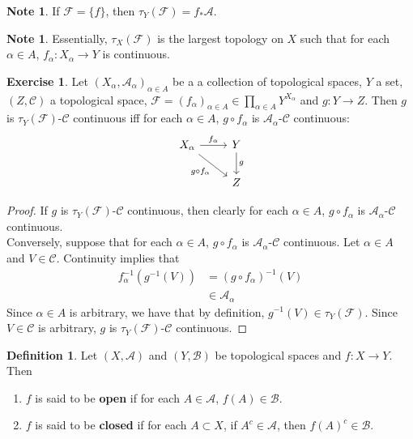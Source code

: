 \documentclass[12pt]{amsart}
\theoremstyle{definition}
\newtheorem{defn}[definition]{Definition}
\newtheorem{note}[definition]{Note}
\newtheorem{ex}[definition]{Exercise}
\newcommand{\al}{\alpha}
\newcommand{\MA}{\mathcal{A}}
\newcommand{\MC}{\mathcal{C}}
\newcommand{\MB}{\mathcal{B}}
\newcommand{\MF}{\mathcal{F}}
\newcommand{\tbf}[1]{\textbf{#1}}
\DeclareMathOperator*{\0}{\mbf{0}}
\DeclareMathOperator*{\1}{\mbf{1}}
\newcommand{\ld}[1]{\label{defn:#1}}
\begin{document}
	\begin{note}
	If $\MF = \{f\}$, then $\tau_Y(\MF) = f_*\MA$.
	\end{note}
	
	\begin{note}
	Essentially, $\tau_X(\MF)$ is the largest topology on $X$ such that for each $\al \in A$, $f_{\al}:X_{\al} \rightarrow Y$ is continuous. 
	\end{note}
	
	\begin{ex}
	Let $(X_{\al}, \MA_{\al})_{\al \in A}$ be a a collection of topological spaces, $Y$ a set, $(Z, \MC)$ a topological space, $\MF = (f_{\al})_{\al \in A} \in \prod \limits_{\al \in A}Y^{X_{\al}}$ and $g: Y \rightarrow Z$. Then $g$ is $\tau_Y(\MF)$-$\MC$ continuous iff for each $\al \in A$, $g \circ f_{\al}$ is $\MA_{\al}$-$\MC$ continuous:
	\[ \begin{tikzcd}
	X_{\al} \arrow[r, "f_{\al}"] \arrow[dr, "g \circ f_{\al}"'] 	
	& Y  \arrow[d, "g"] \\
	& Z 
\end{tikzcd}
	\]
	\end{ex}
	
	\begin{proof}
	If $g$ is $\tau_Y(\MF)$-$\MC$ continuous, then clearly for each $\al \in A$, $g \circ f_{\al}$ is $\MA_{\al}$-$\MC$ continuous. \\
	Conversely, suppose that for each $\al \in A$, $g \circ f_{\al}$ is $\MA_{\al}$-$\MC$ continuous. Let $\al \in A$ and $V \in \MC$. Continuity implies that 
	\begin{align*}
		f_{\al}^{-1}(g^{-1}(V)) 
		& = (g \circ f_{\al})^{-1}(V) \\
		& \in \MA_{\al}
	\end{align*}
	Since $\al \in A$ is arbitrary, we have that by definition, $g^{-1}(V) \in \tau_Y(\MF)$. Since $V \in \MC$ is arbitrary, $g$ is $\tau_Y(\MF)$-$\MC$ continuous.
	\end{proof}
	
	\begin{defn} \ld{}
		Let $(X,\MA)$ and $(Y,\MB)$ be topological spaces and $f:X \rightarrow Y$. Then 
		\begin{enumerate}
			\item $f$ is said to be \tbf{open} if for each $A \in \MA$, $f(A) \in \MB$.
			\item $f$ is said to be \tbf{closed} if for each $A \subset X$, if $A^c \in \MA$, then $f(A)^c \in \MB$. 
		\end{enumerate}
	\end{defn}
\end{document}
